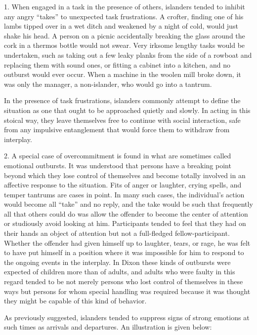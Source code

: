 \documentclass[twoside,symmetric,nobib,justified]{tufte-book}
\begin{document}
1. When engaged in a task in the presence of others, islanders tended to
inhibit any angry ``takes'' to unexpected task frustrations. A crofter,
finding one of his lambs tipped over in a wet ditch and weakened by a
night of cold, would just shake his head. A person on a picnic
accidentally breaking the glass around the cork in a thermos bottle
would not swear. Very irksome lengthy tasks would be undertaken, such as
taking out a few leaky planks from the side of a rowboat and replacing
them with sound ones, or fitting a cabinet into a kitchen, and no
outburst would ever occur. When a machine in the woolen mill broke down,
it was only the manager, a non-islander, who would go into a tantrum.

In the presence of task frustrations, islanders commonly attempt to
define the situation as one that ought to be approached quietly and
slowly. In acting in this stoical way, they leave themselves free to
continue with social interaction, safe from any impulsive entanglement
that would force them to withdraw from interplay.

2. A special case of overcommitment is found in what are sometimes
called emotional outbursts. It was understood that persons have a
breaking point beyond which they lose control of themselves and become
totally involved in an affective response to the situation. Fits of
anger or laughter, crying spells, and temper tantrums are cases in
point. In many such cases, the individual's action would become all
``take'' and no reply, and the take would be such that frequently all
that others could do was allow the offender to become the center of
attention or studiously avoid looking at him. Participants tended to
feel that they had on their hands an object of attention but not a
full-fledged fellow-participant. Whether the offender had given himself
up to laughter, tears, or rage, he was felt to have put himself in a
position where it was impossible for him to respond to the ongoing
events in the interplay. In Dixon these kinds of outbursts were expected
of children more than of adults, and adults who were faulty in this
regard tended to be not merely persons who lost control of themselves in
these ways but persons for whom special handling was required because it
was thought they might be capable of this kind of behavior.

As previously suggested, islanders tended to suppress signs of strong
emotions at such times as arrivals and departures. An illustration is
given below:
\end{document}
